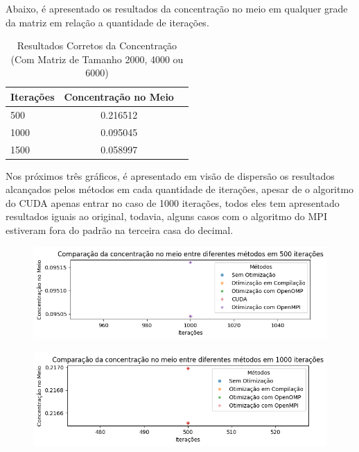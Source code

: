 Abaixo, é apresentado os resultados da concentração no meio em qualquer grade da matriz em relação a quantidade de iterações.

\begin{table}[H]
    \centering
    \caption{Resultados Corretos da Concentração (Com Matriz de Tamanho 2000, 4000 ou 6000)}
    \label{tab:exemplo}
    \begin{tabular}{lcc}
        \toprule
        \textbf{Iterações} & Concentração no Meio \\
        \midrule
        500                & 0.216512             \\
        1000               & 0.095045             \\
        1500               & 0.058997             \\
        \bottomrule
    \end{tabular}
\end{table}

Nos próximos três gráficos, é apresentado em visão de dispersão os resultados alcançados pelos métodos em cada quantidade de iterações, apesar de o algoritmo do CUDA apenas entrar no caso de 1000 iterações, todos eles tem apresentado resultados iguais ao original, todavia, alguns casos com o algoritmo do MPI estiveram fora do padrão na terceira casa do decimal.

\begin{figure}[H]
    \centering
    \includegraphics[width=1\linewidth]{../assets/A.png}
\end{figure}

\begin{figure}[H]
    \centering
    \includegraphics[width=1\linewidth]{../assets/B.png}
\end{figure}

